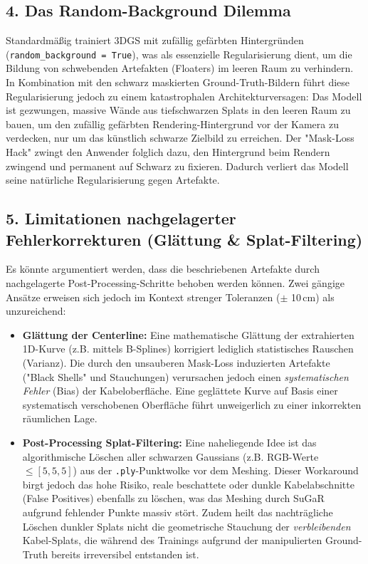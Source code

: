 \documentclass[12pt,a4paper]{article}
\begin{document}
\subsection*{4. Das Random-Background Dilemma}
Standardmäßig trainiert 3DGS mit zufällig gefärbten Hintergründen (\texttt{random\_background = True}), was als essenzielle Regularisierung dient, um die Bildung von schwebenden Artefakten (Floaters) im leeren Raum zu verhindern. In Kombination mit den schwarz maskierten Ground-Truth-Bildern führt diese Regularisierung jedoch zu einem katastrophalen Architekturversagen: Das Modell ist gezwungen, massive Wände aus tiefschwarzen Splats in den leeren Raum zu bauen, um den zufällig gefärbten Rendering-Hintergrund vor der Kamera zu verdecken, nur um das künstlich schwarze Zielbild zu erreichen. Der "Mask-Loss Hack" zwingt den Anwender folglich dazu, den Hintergrund beim Rendern zwingend und permanent auf Schwarz zu fixieren. Dadurch verliert das Modell seine natürliche Regularisierung gegen Artefakte.

\subsection*{5. Limitationen nachgelagerter Fehlerkorrekturen (Glättung \& Splat-Filtering)}
Es könnte argumentiert werden, dass die beschriebenen Artefakte durch nachgelagerte Post-Processing-Schritte behoben werden können. Zwei gängige Ansätze erweisen sich jedoch im Kontext strenger Toleranzen ($\pm$ 10\,cm) als unzureichend:
\begin{itemize}
    \item \textbf{Glättung der Centerline:} Eine mathematische Glättung der extrahierten 1D-Kurve (z.B. mittels B-Splines) korrigiert lediglich statistisches Rauschen (Varianz). Die durch den unsauberen Mask-Loss induzierten Artefakte ("Black Shells" und Stauchungen) verursachen jedoch einen \textit{systematischen Fehler} (Bias) der Kabeloberfläche. Eine geglättete Kurve auf Basis einer systematisch verschobenen Oberfläche führt unweigerlich zu einer inkorrekten räumlichen Lage.
    \item \textbf{Post-Processing Splat-Filtering:} Eine naheliegende Idee ist das algorithmische Löschen aller schwarzen Gaussians (z.B. RGB-Werte $\le [5,5,5]$) aus der \texttt{.ply}-Punktwolke vor dem Meshing. Dieser Workaround birgt jedoch das hohe Risiko, reale beschattete oder dunkle Kabelabschnitte (False Positives) ebenfalls zu löschen, was das Meshing durch SuGaR aufgrund fehlender Punkte massiv stört. Zudem heilt das nachträgliche Löschen dunkler Splats nicht die geometrische Stauchung der \textit{verbleibenden} Kabel-Splats, die während des Trainings aufgrund der manipulierten Ground-Truth bereits irreversibel entstanden ist.
\end{itemize}
\end{document}
